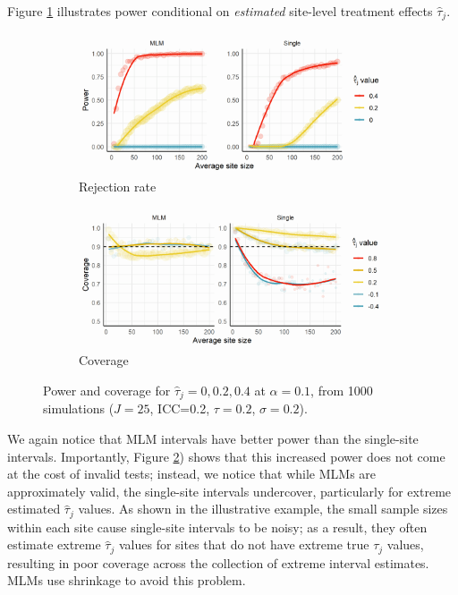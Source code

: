 \documentclass[]{article}
\begin{document}
Figure \ref{fig:pp2} illustrates power conditional on \textit{estimated} site-level treatment effects $\hat{\tau}_j$.
\begin{figure}[ht]
    \centering
    \begin{subfigure}[a]{\textwidth}
    	\includegraphics[width=\textwidth]{pp2}
        \caption{Rejection rate}
    	\label{fig:pp2}
    \end{subfigure}
    \vfill
    \begin{subfigure}[b]{\textwidth}
    	\includegraphics[width=\textwidth]{cp2}
        \caption{Coverage}
    	\label{fig:cp2}
    \end{subfigure}
    \caption{Power and coverage for $\hat{\tau}_j = 0, 0.2, 0.4$ at $\alpha=0.1$, from 1000 simulations ($J=25$, ICC=0.2, $\tau=0.2$, $\sigma=0.2$).}
    \label{fig:pcp2}
\end{figure}
We again notice that MLM intervals have better power than the single-site intervals.
Importantly, Figure \ref{fig:cp2}) shows that this increased power does not come at the cost of invalid tests; instead, we notice that while MLMs are approximately valid, the single-site intervals undercover, particularly for extreme estimated $\hat{\tau}_j$ values.
As shown in the illustrative example, the small sample sizes within each site cause single-site intervals to be noisy; as a result, they often estimate extreme $\hat{\tau}_j$ values for sites that do not have extreme true $\tau_j$ values, resulting in poor coverage across the collection of extreme interval estimates.
MLMs use shrinkage to avoid this problem.
\end{document}
